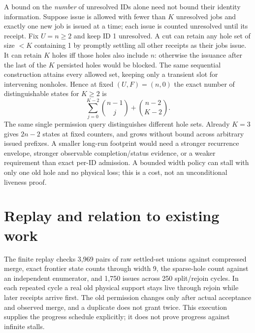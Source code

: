 \documentclass[11pt]{article}
\begin{document}
A bound on the \emph{number} of unresolved IDs alone need not bound their identity information. Suppose issue is allowed with fewer than $K$ unresolved jobs and exactly one new job is issued at a time; each issue is counted unresolved until its receipt. Fix $U=n\ge2$ and keep ID 1 unresolved. A cut can retain any hole set of size $<K$ containing 1 by promptly settling all other receipts as their jobs issue. It can retain $K$ holes iff those holes also include $n$: otherwise the issuance after the last of the $K$ persisted holes would be blocked. The same sequential construction attains every allowed set, keeping only a transient slot for intervening nonholes. Hence at fixed $(U,F)=(n,0)$ the exact number of distinguishable states for $K\ge2$ is
\[
  \sum_{j=0}^{K-2}\binom{n-1}{j}+\binom{n-2}{K-2}.
\]
The same single permission query distinguishes different hole sets. Already $K=3$ gives $2n-2$ states at fixed counters, and grows without bound across arbitrary issued prefixes. A smaller long-run footprint would need a stronger recurrence envelope, stronger observable completion/status evidence, or a weaker requirement than exact per-ID admission. A bounded width policy can stall with only one old hole and no physical loss; this is a cost, not an unconditional liveness proof.

\section{Replay and relation to existing work}
The finite replay checks 3,969 pairs of raw settled-set unions against compressed merge, exact frontier state counts through width 9, the sparse-hole count against an independent enumerator, and 1,750 issues across 250 split/rejoin cycles. In each repeated cycle a real old physical support stays live through rejoin while later receipts arrive first. The old permission changes only after actual acceptance and observed merge, and a duplicate does not grant twice. This execution supplies the progress schedule explicitly; it does not prove progress against infinite stalls.
\end{document}
